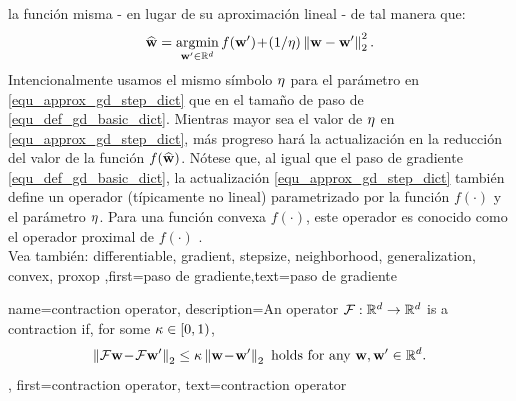 {{ la función misma - en lugar de su aproximación lineal - de tal manera que:
 \begin{align} 
 \label{equ_approx_gd_step_dict}
 \widehat{{\bf w}} = \operatorname*{argmin}_{{\bf w}' \in \mathbb{R}^{d}} f({\bf w}')\!+\!(1/\eta)\left\Vert {{\bf w}-{\bf w}'} \right\Vert_{2}^2. 
 \end{align}
 Intencionalmente usamos el mismo símbolo $\eta$ para el parámetro en \eqref{equ_approx_gd_step_dict} 
 que en el tamaño de paso de \eqref{equ_def_gd_basic_dict}. Mientras mayor sea el valor de $\eta$ en 
 \eqref{equ_approx_gd_step_dict}, más progreso hará la actualización en la reducción del valor de la función $f(\widehat{{\bf w}})$. 
 Nótese que, al igual que el paso de gradiente \eqref{equ_def_gd_basic_dict}, 
 la actualización \eqref{equ_approx_gd_step_dict} también define un operador (típicamente no lineal)  
 parametrizado por la función $f(\cdot)$ y el parámetro $\eta$. Para una función convexa  
 $f(\cdot)$, este operador es conocido como el operador proximal de $f(\cdot)$ \cite{ProximalMethods}. 
 \\
		Vea también: \gls{differentiable}, \gls{gradient}, \gls{stepsize}, \gls{neighborhood}, \gls{generalization}, \gls{convex}, \gls{proxop} },first={paso de gradiente},text={paso de gradiente}}

		{name={contraction operator},
			description={An operator $\mathcal{F}: \mathbb{R}^{d} \rightarrow \mathbb{R}^{d}$
				is a contraction if, for some $\kappa \in [0,1)$,
				\begin{equation} 
					\nonumber
					\left\Vert { \mathcal{F}{\bf w}\!-\!\mathcal{F}{\bf w}'} \right\Vert_{2}  \leq  \kappa	\left\Vert {{\bf w}\!-\!{\bf w}'} \right\Vert_{2} \mbox{ holds for any } {\bf w},{\bf w}' \in \mathbb{R}^{d}.
				\end{equation}
			},
			first={contraction operator},
			text={contraction operator} 
			
			
		}
			

